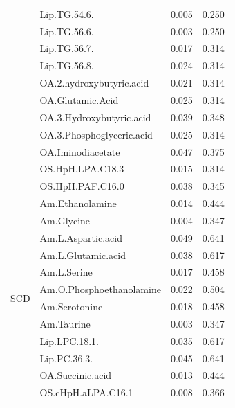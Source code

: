 \documentclass{amsart}
\begin{document}
\begin{table}[H]
\begin{tabular}{clll}
& Lip.TG.54.6.                  & 0.005              & 0.250        \\
& Lip.TG.56.6.                  & 0.003              & 0.250        \\
& Lip.TG.56.7.                  & 0.017              & 0.314        \\
& Lip.TG.56.8.                  & 0.024              & 0.314        \\
& OA.2.hydroxybutyric.acid      & 0.021              & 0.314        \\
& OA.Glutamic.Acid              & 0.025              & 0.314        \\
& OA.3.Hydroxybutyric.acid      & 0.039              & 0.348        \\
& OA.3.Phosphoglyceric.acid     & 0.025              & 0.314        \\
& OA.Iminodiacetate             & 0.047              & 0.375        \\
& OS.HpH.LPA.C18.3              & 0.015              & 0.314        \\
& OS.HpH.PAF.C16.0              & 0.038              & 0.345       \\ \midrule
\multirow{17}{*}{SCD}& Am.Ethanolamine                      & 0.014              & 0.444        \\
& Am.Glycine                           & 0.004              & 0.347        \\
& Am.L.Aspartic.acid                   & 0.049              & 0.641        \\
& Am.L.Glutamic.acid                   & 0.038              & 0.617        \\
& Am.L.Serine                          & 0.017              & 0.458        \\
& Am.O.Phosphoethanolamine             & 0.022              & 0.504        \\
& Am.Serotonine                        & 0.018              & 0.458        \\
& Am.Taurine                           & 0.003              & 0.347        \\
& Lip.LPC.18.1.                        & 0.035              & 0.617        \\
& Lip.PC.36.3.                         & 0.045              & 0.641        \\
& OA.Succinic.acid                & 0.013              & 0.444        \\
& OS.cHpH.aLPA.C16.1                   & 0.008              & 0.366        \\

\end{tabular}
\end{table}
\end{document}
